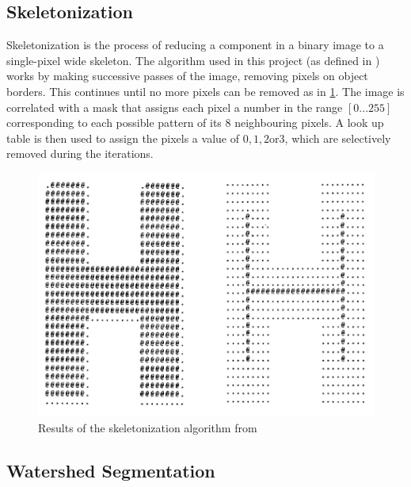
\subsection{Skeletonization}
\label{sec:skeletonization}

Skeletonization is the process of reducing a component in a binary image to a single-pixel wide skeleton. The algorithm used in this project (as defined in \cite{zhang1984fast}) works by making successive passes of the image, removing pixels on object borders. This continues until no more pixels can be removed as in \cref{fig:skeletonization-example}.  The image is correlated with a mask that assigns each pixel a number in the range $[0...255]$ corresponding to each possible pattern of its $8$ neighbouring pixels. A look up table is then used to assign the pixels a value of $0, 1, 2 \text{or} 3$, which are selectively removed during the iterations.

\begin{figure}[H]
  \includegraphics{gfx/skeletonization.png}
  \caption{Results of the skeletonization algorithm from \cite{zhang1984fast}}
  \label{fig:skeletonization-example}
\end{figure}


\subsection{Watershed Segmentation}

